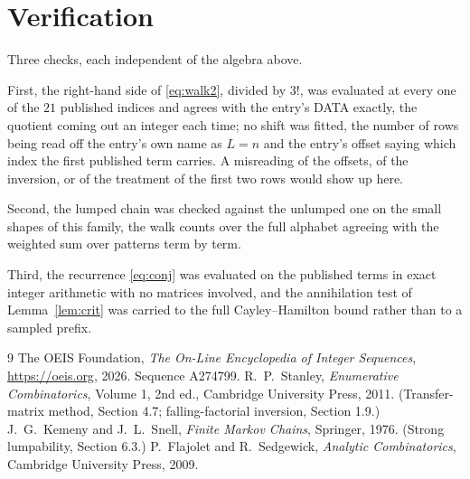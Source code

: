 \documentclass[11pt,a4paper]{article}
\theoremstyle{plain}
\theoremstyle{definition}
\begin{document}
\section{Verification}

Three checks, each independent of the algebra above.

First, the right-hand side of \eqref{eq:walk2}, divided by $3!$, was evaluated at every
one of the $21$ published indices and agrees with the entry's DATA exactly, the quotient
coming out an integer each time; no shift was fitted, the number of rows being read off the
entry's own name as $L=n$ and the entry's offset saying which index the first published
term carries. A misreading of the offsets, of the inversion, or of the treatment of the first
two rows would show up here.

Second, the lumped chain was checked against the unlumped one on the small shapes of this
family, the walk counts over the full alphabet agreeing with the weighted sum over patterns
term by term.

Third, the recurrence \eqref{eq:conj} was evaluated on the published terms in exact integer
arithmetic with no matrices involved, and the annihilation test of Lemma~\ref{lem:crit} was
carried to the full Cayley--Hamilton bound rather than to a sampled prefix.

\begin{thebibliography}{9}
 The OEIS Foundation, \emph{The On-Line Encyclopedia of Integer
Sequences}, \url{https://oeis.org}, 2026. Sequence A274799.
 R.~P.~Stanley, \emph{Enumerative Combinatorics}, Volume 1, 2nd ed.,
Cambridge University Press, 2011. (Transfer-matrix method, Section 4.7; falling-factorial
inversion, Section 1.9.)
 J.~G.~Kemeny and J.~L.~Snell, \emph{Finite Markov Chains}, Springer,
1976. (Strong lumpability, Section 6.3.)
 P.~Flajolet and R.~Sedgewick, \emph{Analytic Combinatorics}, Cambridge
University Press, 2009.
\end{thebibliography}
\end{document}
